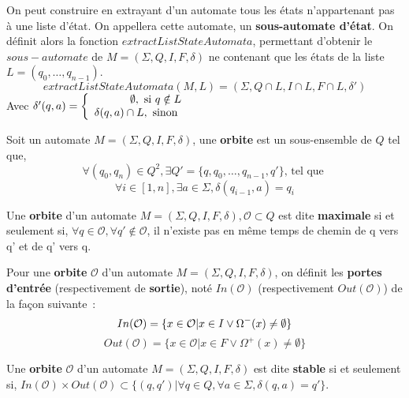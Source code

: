 \begin{Definition}
  On peut construire en extrayant d'un automate tous les états n'appartenant pas 
  à une liste d'état. On appellera cette automate, un 
  \textbf{sous-automate d'état}. On définit alors la fonction 
  \(extractListStateAutomata\), permettant d'obtenir le \(sous-automate\) de 
  \(M = (\Sigma, Q, I, F, \delta)\) ne contenant que les états de la liste 
  \(L = (q_0, \dots, q_{n-1})\).
  \[
    extractListStateAutomata(M, L) = (\Sigma, Q \cap L, I \cap L, F \cap L, 
    \delta')
  \]
  Avec \(\delta'(q, a) = \left \{
    \begin{array}{r c l}
      \emptyset, \text{ si } q \notin L\\
      \delta(q, a) \cap L, \text{ sinon } \\
    \end{array}
    \right .\)
\end{Definition}

\begin{Definition}
  Soit un automate \(M = (\Sigma, Q, I, F, \delta)\), une \textbf{orbite} est un 
  sous-ensemble de \(Q\) tel que, 
  \[
    \forall (q_0, q_n) \in Q^2, \exists Q' = \{q, q_0, \dots, q_{n-1}, q'\} 
    \text{, tel que }
  \]
  \[
    \forall i \in [1, n], \exists a \in \Sigma, \delta(q_{i - 1}, a) = q_{i}
  \]
\end{Definition}

\begin{Definition}
  Une \textbf{orbite} d'un automate \(M = (\Sigma, Q, I, F, \delta), \mathcal{O} 
  \subset Q\) est dite \textbf{maximale} si et seulement si, 
  \(\forall q \in \mathcal{O}, \forall q' \notin \mathcal{O}\), il n'existe pas 
  en même temps de chemin de q vers q' et de q' vers q.  
\end{Definition}

\begin{Definition}
  Pour une \textbf{orbite} \(\mathcal{O}\) d'un automate \(M = (\Sigma, Q, I, F, 
  \delta)\), on définit les \textbf{portes d'entrée} (respectivement de 
  \textbf{sortie}), noté \(In(\mathcal{O})\) (respectivement 
  \(Out(\mathcal{O})\)) de la façon suivante~:
  \[
    In(\mathcal{O}) = \{x \in \mathcal{O} | x \in I \lor \Omega^{-}(x) \neq
    \emptyset\}\\
  \]
  \[
    Out(\mathcal{O}) = \{x \in \mathcal{O} | x \in F \lor \Omega^{+}(x) \neq
    \emptyset\}
  \]
\end{Definition}

\begin{Definition}
  Une \textbf{orbite} \(\mathcal{O}\) d'un automate \(M = (\Sigma, Q, I, F, 
  \delta)\) est dite \textbf{stable} si et seulement si, \(In(\mathcal{O}) 
  \times Out(\mathcal{O}) \subset \{(q, q') | \forall q \in Q, \forall a \in 
  \Sigma, \delta(q, a) = q'\}\).
\end{Definition}

